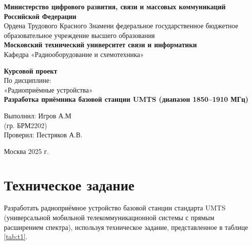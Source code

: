 \documentclass[a4paper,12pt]{article}
\begin{document}
\thispagestyle{empty} %
\begin{center}
\large \textbf{Министерство цифрового развития, связи и массовых коммуникаций Российской Федерации}\\[0.8em]
\large Ордена Трудового Красного Знамени федеральное государственное бюджетное образовательное учреждение высшего образования \\[0.3em]
\large \textbf{Московский технический университет связи и информатики}  \\[0.4em]
\large Кафедра «Радиооборудование и схемотехника»\\[1em]
\end{center}

\vspace*{3cm}

\begin{center}
\large \textbf{Курсовой проект} \\[1em]
\large По дисциплине: \\«Радиоприёмные устройства» \\[1em]
\Large \textbf{Разработка приёмника базовой станции UMTS  (диапазон 1850–1910 МГц)} \\[3em]
\end{center}

\vfill %

\begin{flushright}
Выполнил:   Игров А.М \qquad\qquad \\(гр. БРМ2202) \\
Проверил:   Пестряков А.В.\\[3.5em]
\end{flushright}

\begin{center}
Москва 2025 г.
\end{center}

\newpage
\tableofcontents
\newpage

\section{Техническое задание}
Разработать радиоприёмное устройство базовой станции стандарта UMTS (универсальной мобильной телекоммуникационной системы с прямым расширением спектра), используя техническое задание, представленное в таблице \ref{tab:t1}.
\end{document}

